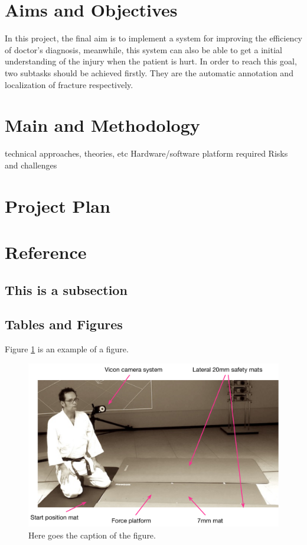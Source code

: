 \documentclass[12pt,oneside,a4paper]{article}
\begin{document}
\section{Aims and Objectives}
In this project, the final aim is to implement a system for improving the efficiency of doctor’s diagnosis, meanwhile, this system can also be able to get a initial understanding of the injury when the patient is hurt. In order to reach this goal, two subtasks should be achieved firstly. They are the automatic annotation and localization of fracture respectively.
\section{Main and Methodology}
technical approaches, theories, etc
Hardware/software platform required
Risks and challenges

\section{Project Plan}
\section{Reference}
\subsection{This is a subsection}

\subsection{Tables and Figures}

Figure \ref{fig.niceFigure} is an example of a figure.
\begin{figure}
\begin{center}
\includegraphics[width=0.6\columnwidth]{f2_expSetup}
\caption{Here goes the caption of the figure.}
\label{fig.niceFigure}
\end{center}
\end{figure}
\end{document}
